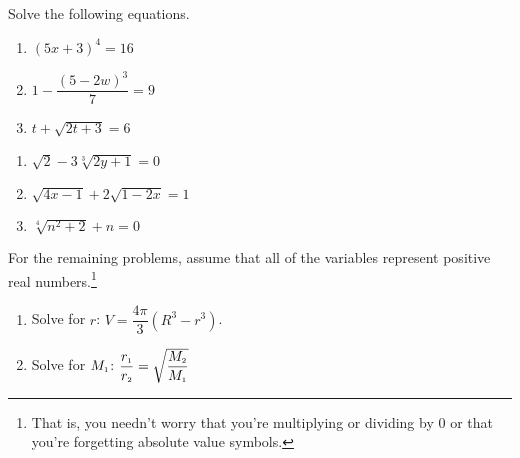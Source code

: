 \begin{ex}\label{radicaleqnreview}  Solve the following equations.


\begin{multicols}{3}
\begin{enumerate}


\item  $(5x +3)^{4} = 16$

\item  $1 - \dfrac{(5-2w)^3}{7} = 9$

\item  $t + \sqrt{2t+3} = 6$


\setcounter{HW}{\value{enumi}}
\end{enumerate}
\end{multicols}

\begin{multicols}{3}
\begin{enumerate}

\setcounter{enumi}{\value{HW}}

\item $\sqrt{2} - 3\sqrt[3]{2y+1} = 0$ 

\item  $\sqrt{4x-1}  + 2\sqrt{1 - 2x} = 1$

\item  $\sqrt[4]{n^2 + 2} + n = 0$

\setcounter{HW}{\value{enumi}}
\end{enumerate}
\end{multicols}

For the remaining problems, assume that all of the variables represent positive real numbers.\footnote{That is, you needn't worry that you're multiplying or dividing by $0$ or that you're forgetting absolute value symbols.}

\begin{multicols}{2}
\begin{enumerate}

\setcounter{enumi}{\value{HW}}

\item  Solve for $r$:  $V = \dfrac{4\pi}{3}(R^3 - r^3)$.
\item  Solve for $M_{\text{\tiny$1$}}$:  $\dfrac{r_{\text{\tiny$1$}}}{r_{\text{\tiny$2$}}} = \sqrt{\dfrac{M_{\text{\tiny$2$}}}{M_{\text{\tiny$1$}}}}$



\end{enumerate}
\end{multicols}
\end{ex}

